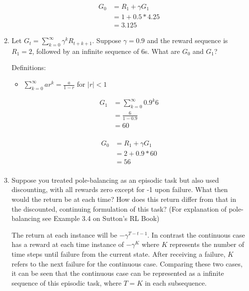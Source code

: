 \documentclass[11pt,onecolumn]{article}
\begin{document}
\begin{enumerate}
    \begin{equation}
        \begin{aligned}
            G_0 & = R_{1} + \gamma G_{1} \\ 
            & = 1 + 0.5 * 4.25 \\
            & = 3.125
        \end{aligned}
    \end{equation}
    \item Let $G_t = \sum_{k=0}^\infty \gamma^k R_{t+k+1}$. Suppose $\gamma = 0.9$ and the reward sequence is $R_1 =2$, followed by an infinite sequence of 6s. What are $G_0$ and $G_1$?
    \setlength{\parskip}{6pt}
    
    Definitions:
    \begin{itemize}
        \item $\sum_{k=0}^{\infty} ar^k = \frac{a}{1-r}$ for $\vert r \vert < 1$
    \end{itemize}
    \begin{equation}
        \begin{aligned}
        G_1 & = \sum_{k=0}^\infty 0.9^k6\\
        & = \frac{6}{1-0.9}\\
        & = 60\\ 
        \end{aligned}
    \end{equation}

    \begin{equation}
        \begin{aligned}
        G_0 & = R_{1} + \gamma G_{1} \\ 
        & = 2 + 0.9*60\\
        & = 56\\ 
        \end{aligned}
    \end{equation}
    \item Suppose you treated pole-balancing as an episodic task but also used discounting, with all rewards zero except for -1 upon failure. What then would the return be at each time? How does this return differ from that in the discounted, continuing formulation of this task? (For explanation of pole-balancing see Example 3.4 on Sutton's RL Book)
    \setlength{\parskip}{6pt}

    The return at each instance will be $-\gamma ^{T-t-1}$. In contrast the continuous case has a reward at each time instance of $-\gamma^{K}$ where $K$ represents the number of time steps until failure from the current state. After receiving a failure, $K$ refers to the next failure for the continuous case. Comparing these two cases, it can be seen that the continuous case can be represented as a infinite sequence of this episodic task, where $T=K$ in each subsequence.
    

\end{enumerate}
\end{document}
